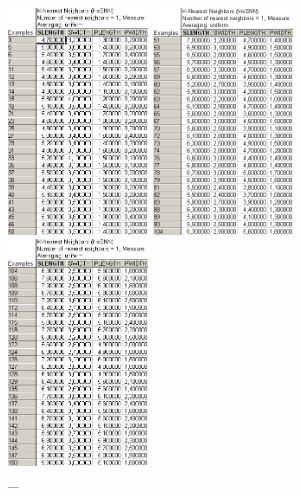 \begin{figure}[!h]
  \centering

  \begin{minipage}{0.32\textwidth}
    \centering

    \includegraphics[height=6cm]
    {inc/ex_15.PNG}

    \caption{\_}

    \label{fig:14_1}
  \end{minipage}
  \begin{minipage}{0.32\textwidth}
    \centering

    \includegraphics[height=6cm]
    {inc/ex_16.PNG}

    \caption{\_}

    \label{fig:14_2}
  \end{minipage}
  \begin{minipage}{0.32\textwidth}
    \centering

    \includegraphics[height=6cm]
    {inc/ex_17.PNG}

    \caption{\_}

    \label{fig:14_3}
  \end{minipage}
\end{figure}

